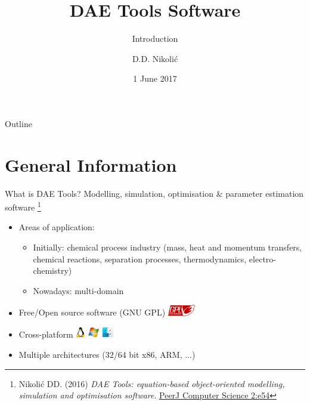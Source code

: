 \documentclass[compress,newPxFont,sthlmFooter]{beamer}
\title{DAE Tools Software}
\subtitle{Introduction}
\author{D.D. Nikolić}
\institute
{
  DAE Tools Project, \url{http://www.daetools.com}
}
\date{1 June 2017}
\begin{document}
\maketitle

\begin{frame}{Outline}
\tableofcontents[sectionstyle=show, 
                 subsectionstyle=hide]
\end{frame} 

\section{General Information}

\begin{frame}{What is DAE Tools?} 
\alert{Modelling}, \alert{simulation}, \alert{optimisation} \& \alert{parameter estimation} software
\footnote{\tiny{Nikolić DD. (2016) \textit{DAE Tools: equation-based object-oriented modelling, simulation and optimisation software}.
          \href{https://doi.org/10.7717/peerj-cs.54}{PeerJ Computer Science 2:e54}}
         }

\begin{itemize}
  \item Areas of application:
    \begin{itemize}
      \item Initially: \alert{chemical process industry} (mass, heat and momentum transfers, chemical reactions, 
                                                          separation processes, thermodynamics, electro-chemistry)
      \item Nowadays: \alert{multi-domain}
    \end{itemize}
  \item \alert{Free/Open source software} (GNU GPL) \includegraphics[align=c,height=1.3em]{gnu_gpl3.png}
  \item \alert{Cross-platform} \includegraphics[align=c,height=1.3em]{linux.png} 
                               \includegraphics[align=c,height=1.3em]{windows.png} 
                               \includegraphics[align=c,height=1.3em]{macos.png}
  \item \alert{Multiple architectures} (32/64 bit x86, ARM, ...)
\end{itemize}
\end{frame}
\end{document}
